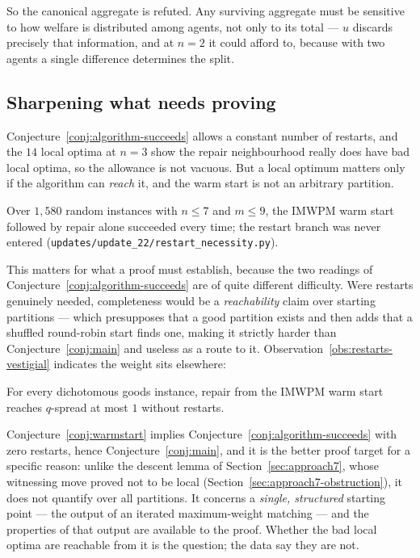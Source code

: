 So the canonical aggregate is refuted. Any surviving aggregate must be
sensitive to how welfare is distributed among agents, not only to its total ---
$u$ discards precisely that information, and at $n = 2$ it could afford to,
because with two agents a single difference determines the split.

\subsection{Sharpening what needs proving}
\label{sec:approach6-sharpen}

Conjecture~\ref{conj:algorithm-succeeds} allows a constant number of restarts,
and the $14$ local optima at $n = 3$ show the repair neighbourhood really does
have bad local optima, so the allowance is not vacuous. But a local optimum
matters only if the algorithm can \emph{reach} it, and the warm start is not an
arbitrary partition.

\begin{observation}
\label{obs:restarts-vestigial}
Over $1{,}580$ random instances with $n \le 7$ and $m \le 9$, the IMWPM warm
start followed by repair alone succeeded every time; the restart branch was
never entered (\texttt{updates/update\_22/restart\_necessity.py}).
\end{observation}

This matters for what a proof must establish, because the two readings of
Conjecture~\ref{conj:algorithm-succeeds} are of quite different difficulty.
Were restarts genuinely needed, completeness would be a \emph{reachability}
claim over starting partitions --- which presupposes that a good partition
exists and then adds that a shuffled round-robin start finds one, making it
strictly harder than Conjecture~\ref{conj:main} and useless as a route to it.
Observation~\ref{obs:restarts-vestigial} indicates the weight sits elsewhere:

\begin{conjecture}
\label{conj:warmstart}
For every dichotomous goods instance, repair from the IMWPM warm start reaches
$q$-spread at most $1$ without restarts.
\end{conjecture}

Conjecture~\ref{conj:warmstart} implies Conjecture~\ref{conj:algorithm-succeeds}
with zero restarts, hence Conjecture~\ref{conj:main}, and it is the better proof
target for a specific reason: unlike the descent lemma of
Section~\ref{sec:approach7}, whose witnessing move proved not to be local
(Section~\ref{sec:approach7-obstruction}), it does not quantify over all
partitions. It concerns a \emph{single, structured} starting point --- the
output of an iterated maximum-weight matching --- and the properties of that
output are available to the proof. Whether the bad local optima are reachable
from it is the question; the data say they are not.

